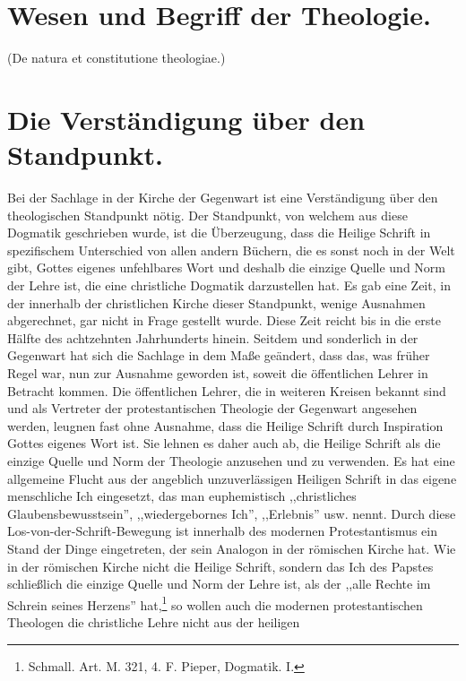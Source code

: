 \section*{Wesen und Begriff der Theologie.}
(De natura et constitutione theologiae.)

\section{Die Verständigung über den Standpunkt.}

Bei der Sachlage in der Kirche der Gegenwart ist eine Verständigung über den theologischen Standpunkt nötig. Der Standpunkt, von welchem aus diese Dogmatik geschrieben wurde, ist die Überzeugung, dass die Heilige Schrift in spezifischem Unterschied von allen andern Büchern, die es sonst noch in der Welt gibt, Gottes eigenes unfehlbares Wort und deshalb die einzige Quelle und Norm der Lehre ist, die eine christliche Dogmatik darzustellen hat. Es gab eine Zeit, in der innerhalb der christlichen Kirche dieser Standpunkt, wenige Ausnahmen abgerechnet, gar nicht in Frage gestellt wurde. Diese Zeit reicht bis in die erste Hälfte des achtzehnten Jahrhunderts hinein. Seitdem und sonderlich in der Gegenwart hat sich die Sachlage in dem Maße geändert, dass das, was früher Regel war, nun zur Ausnahme geworden ist, soweit die öffentlichen Lehrer in Betracht kommen. Die öffentlichen Lehrer, die in weiteren Kreisen bekannt sind und als Vertreter der protestantischen Theologie der Gegenwart angesehen werden, leugnen fast ohne Ausnahme, dass die Heilige Schrift durch Inspiration Gottes eigenes Wort ist. Sie lehnen es daher auch ab, die Heilige Schrift als die einzige Quelle und Norm der Theologie anzusehen und zu verwenden. Es hat eine allgemeine Flucht aus der angeblich unzuverlässigen Heiligen Schrift in das eigene menschliche Ich eingesetzt, das man euphemistisch ,,christliches Glaubensbewusstsein'', ,,wiedergebornes Ich'', ,,Erlebnis'' usw. nennt. Durch diese Los-von-der-Schrift-Bewegung ist innerhalb des modernen Protestantismus ein Stand der Dinge eingetreten, der sein Analogon in der römischen Kirche hat. Wie in der römischen Kirche nicht die Heilige Schrift, sondern das Ich des Papstes schließlich die einzige Quelle und Norm der Lehre ist, als der ,,alle Rechte im Schrein seines Herzens'' hat,\footnote{Schmall. Art. M. 321, 4. F. Pieper, Dogmatik. I.} so wollen auch die modernen protestantischen Theologen die christliche Lehre nicht aus der heiligen